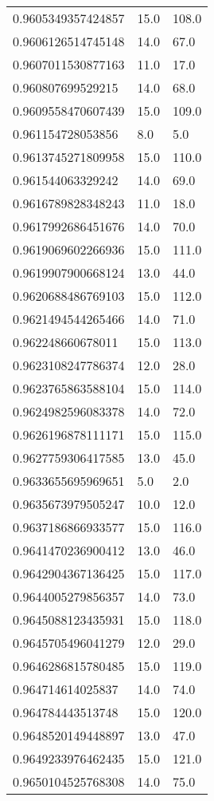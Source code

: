 \begin{center}
\begin{supertabular}[H]{p{0.30\textwidth}p{0.05\textwidth}p{0.05\textwidth}}
0.9605349357424857 & 15.0 & 108.0 \\ 
0.9606126514745148 & 14.0 & 67.0 \\ 
0.9607011530877163 & 11.0 & 17.0 \\ 
0.960807699529215 & 14.0 & 68.0 \\ 
0.9609558470607439 & 15.0 & 109.0 \\ 
0.961154728053856 & 8.0 & 5.0 \\ 
0.9613745271809958 & 15.0 & 110.0 \\ 
0.961544063329242 & 14.0 & 69.0 \\ 
0.9616789828348243 & 11.0 & 18.0 \\ 
0.9617992686451676 & 14.0 & 70.0 \\ 
0.9619069602266936 & 15.0 & 111.0 \\ 
0.9619907900668124 & 13.0 & 44.0 \\ 
0.9620688486769103 & 15.0 & 112.0 \\ 
0.9621494544265466 & 14.0 & 71.0 \\ 
0.962248660678011 & 15.0 & 113.0 \\ 
0.9623108247786374 & 12.0 & 28.0 \\ 
0.9623765863588104 & 15.0 & 114.0 \\ 
0.9624982596083378 & 14.0 & 72.0 \\ 
0.9626196878111171 & 15.0 & 115.0 \\ 
0.9627759306417585 & 13.0 & 45.0 \\ 
0.9633655695969651 & 5.0 & 2.0 \\ 
0.9635673979505247 & 10.0 & 12.0 \\ 
0.9637186866933577 & 15.0 & 116.0 \\ 
0.9641470236900412 & 13.0 & 46.0 \\ 
0.9642904367136425 & 15.0 & 117.0 \\ 
0.9644005279856357 & 14.0 & 73.0 \\ 
0.9645088123435931 & 15.0 & 118.0 \\ 
0.9645705496041279 & 12.0 & 29.0 \\ 
0.9646286815780485 & 15.0 & 119.0 \\ 
0.964714614025837 & 14.0 & 74.0 \\ 
0.964784443513748 & 15.0 & 120.0 \\ 
0.9648520149448897 & 13.0 & 47.0 \\ 
0.9649233976462435 & 15.0 & 121.0 \\ 
0.9650104525768308 & 14.0 & 75.0 \\ 

\end{supertabular}
\end{center}

